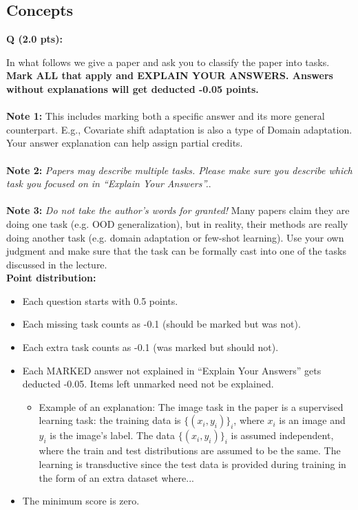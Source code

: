 \documentclass{article}
\newcounter{questionno}
\newcounter{partno}
\newcommand{\question}[1]{
\noindent
\newline
\stepcounter{questionno}
\setcounter{partno}{0}
{\bf Q\arabic{questionno} (#1 pts): }
}
\begin{document}
\subsection*{Concepts}

\question{2.0} 
In what follows we give a paper and ask you to classify the paper into tasks.\\ 

{\bf Mark ALL that apply and EXPLAIN YOUR ANSWERS. Answers without explanations will get deducted -0.05 points.}\\
~\\
{\bf Note 1:} This includes marking both a specific answer and its more general counterpart. E.g., Covariate shift adaptation is also a type of Domain adaptation. Your answer explanation can help assign partial credits. \\
~\\
{\bf Note 2:} {\em Papers may describe multiple tasks. Please make sure you describe which task you focused on in ``Explain Your Answers''.}. \\
~\\
{\color{red}
{\bf Note 3:} {\em Do not take the author's words for granted!} Many papers claim they are doing one task (e.g. OOD generalization), but in reality, their methods are really doing another task (e.g. domain adaptation or few-shot learning). Use your own judgment and make sure that the task can be formally cast into one of the tasks discussed in the lecture.
}~\\

{\bf Point distribution:}
\begin{itemize}
	\item Each question starts with 0.5 points.
	\item Each missing task counts as -0.1 (should be marked but was not).
	\item Each extra task counts as -0.1 (was marked but should not).
	\item Each MARKED answer not explained in ``Explain Your Answers'' gets deducted -0.05. Items left unmarked need not be explained.
		\begin{itemize}
			\item Example of an explanation: The image task in the paper is a supervised learning task: the training data is $\{(x_i,y_i)\}_i$, where $x_i$ is an image and $y_i$ is the image's label. The data $\{(x_i,y_i)\}_i$ is assumed independent, where the train and test distributions are assumed to be the same. The learning is transductive since the test data is provided during training in the form of an extra dataset where...
		\end{itemize}   
	
	\item The minimum score is zero.
\end{itemize}   
\end{document}
